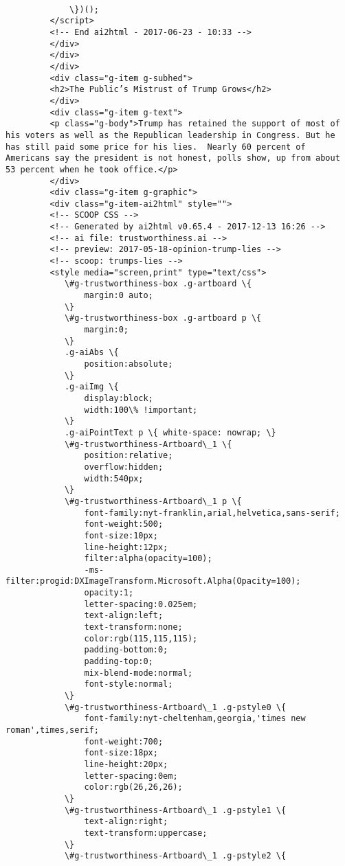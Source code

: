 \documentclass[11pt]{article}
\begin{document}
\begin{Verbatim}[commandchars=\\\{\}]
                
             \})();
         </script>
         <!-- End ai2html - 2017-06-23 - 10:33 -->
         </div>
         </div>
         </div>
         <div class="g-item g-subhed">
         <h2>The Public’s Mistrust of Trump Grows</h2>
         </div>
         <div class="g-item g-text">
         <p class="g-body">Trump has retained the support of most of his voters as well as the Republican leadership in Congress. But he has still paid some price for his lies.  Nearly 60 percent of Americans say the president is not honest, polls show, up from about 53 percent when he took office.</p>
         </div>
         <div class="g-item g-graphic">
         <div class="g-item-ai2html" style="">
         <!-- SCOOP CSS -->
         <!-- Generated by ai2html v0.65.4 - 2017-12-13 16:26 -->
         <!-- ai file: trustworthiness.ai -->
         <!-- preview: 2017-05-18-opinion-trump-lies -->
         <!-- scoop: trumps-lies -->
         <style media="screen,print" type="text/css">
         	\#g-trustworthiness-box .g-artboard \{
         		margin:0 auto;
         	\}
         	\#g-trustworthiness-box .g-artboard p \{
         		margin:0;
         	\}
         	.g-aiAbs \{
         		position:absolute;
         	\}
         	.g-aiImg \{
         		display:block;
         		width:100\% !important;
         	\}
         	.g-aiPointText p \{ white-space: nowrap; \}
         	\#g-trustworthiness-Artboard\_1 \{
         		position:relative;
         		overflow:hidden;
         		width:540px;
         	\}
         	\#g-trustworthiness-Artboard\_1 p \{
         		font-family:nyt-franklin,arial,helvetica,sans-serif;
         		font-weight:500;
         		font-size:10px;
         		line-height:12px;
         		filter:alpha(opacity=100);
         		-ms-filter:progid:DXImageTransform.Microsoft.Alpha(Opacity=100);
         		opacity:1;
         		letter-spacing:0.025em;
         		text-align:left;
         		text-transform:none;
         		color:rgb(115,115,115);
         		padding-bottom:0;
         		padding-top:0;
         		mix-blend-mode:normal;
         		font-style:normal;
         	\}
         	\#g-trustworthiness-Artboard\_1 .g-pstyle0 \{
         		font-family:nyt-cheltenham,georgia,'times new roman',times,serif;
         		font-weight:700;
         		font-size:18px;
         		line-height:20px;
         		letter-spacing:0em;
         		color:rgb(26,26,26);
         	\}
         	\#g-trustworthiness-Artboard\_1 .g-pstyle1 \{
         		text-align:right;
         		text-transform:uppercase;
         	\}
         	\#g-trustworthiness-Artboard\_1 .g-pstyle2 \{

\end{Verbatim}
\end{document}
